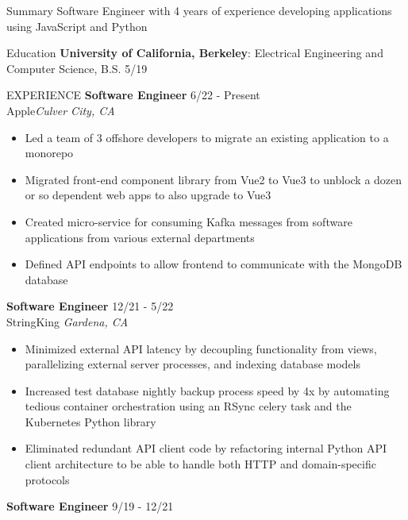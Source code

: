 \documentclass{resume}
\begin{document}
    \begin{rSection}{Summary}
        {Software Engineer with 4 years of experience developing applications using JavaScript and Python}
    \end{rSection}

    \begin{rSection}{Education}
        {\bf University of California, Berkeley}: Electrical Engineering and Computer Science, B.S. \hfill {5/19}
    \end{rSection}

    \begin{rSection}{EXPERIENCE}
        \textbf{Software Engineer} \hfill 6/22 - Present\\
        Apple\hfill \textit{Culver City, CA}
        \begin{itemize}
            \itemsep -3pt {} 
            \item Led a team of 3 offshore developers to migrate an existing application to a monorepo
            \item Migrated front-end component library from Vue2 to Vue3 to unblock a dozen or so dependent web apps to also upgrade to Vue3
            \item Created micro-service for consuming Kafka messages from software applications from various external departments
            \item Defined API endpoints to allow frontend to communicate with the MongoDB database
        \end{itemize}
        \textbf{Software Engineer} \hfill 12/21 - 5/22\\
        StringKing \hfill \textit{Gardena, CA}
        \begin{itemize}
            \itemsep -3pt {} 
            \item Minimized external API latency by decoupling functionality from views, parallelizing external server processes, and indexing database models
            \item Increased test database nightly backup process speed by 4x by automating tedious container orchestration using an RSync celery task and the Kubernetes Python library
            \item Eliminated redundant API client code by refactoring internal Python API client architecture to be able to handle both HTTP and domain-specific protocols
        \end{itemize}
        \textbf{Software Engineer} \hfill 9/19 - 12/21\\

\end{rSection}
\end{document}
